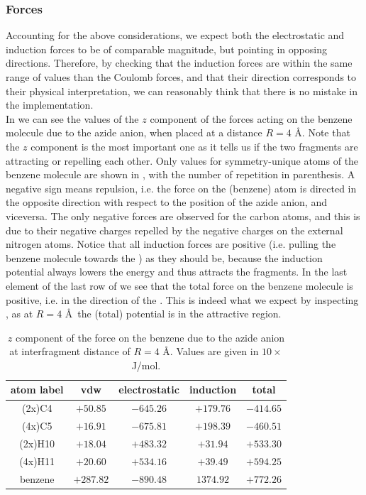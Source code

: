 \documentclass[utf8]{article}
\begin{document}
\subsubsection{Forces}
Accounting for the above considerations, we expect both the electrostatic and induction forces
to be of comparable magnitude, but pointing in opposing directions.
Therefore, by checking that the induction forces are within the same range of values than
the Coulomb forces, and that their direction corresponds to their physical interpretation,
we can reasonably think that there is no mistake in the implementation.\\
In  we can see the values of the $z$ component of the forces acting
on the benzene molecule due to the azide anion, when placed at a distance $R=4$ \AA.
Note that the $z$ component is the most important one as it tells us if the two fragments
are attracting or repelling each other.
Only values for symmetry-unique atoms of the benzene molecule are shown in
, with the number of repetition in parenthesis.
A negative sign means repulsion, i.e. the force on the (benzene) atom is directed in the
opposite direction with respect to the position of the azide anion, and viceversa.
The only negative forces are observed for the carbon atoms, and this is due to their negative
charges repelled by the negative charges on the external nitrogen atoms.
Notice that all induction forces are positive (i.e. pulling the benzene molecule towards
the \ntm) as they should be, because the induction potential always lowers the energy and
thus attracts the fragments.
In the last element of the last row of  we see that
the total force on the benzene molecule is positive, i.e. in the direction of the \ntm.
This is indeed what we expect by inspecting , as at $R=4$ \AA\ the
(total) potential is in the attractive region.\\
%
\begin{table}
    \captionsetup{width=\textwidth}
    \centering
    \caption{$z$ component of the force on the benzene due to the azide anion
    at interfragment distance of $R=4$ \AA. Values are given in $10\times$J/mol.}
    \begin{tabular}{ccccc}
    \toprule
    atom label  & vdw     & electrostatic & induction & total \\
    \midrule
    (2x)C4    & $+50.85$  & $-645.26$     & $+179.76$ & $-414.65$ \\
    (4x)C5    & $+16.91$  & $-675.81$     & $+198.39$ & $-460.51$ \\
    (2x)H10   & $+18.04$  & $+483.32$     & $+31.94$  & $+533.30$ \\
    (4x)H11   & $+20.60$  & $+534.16$     & $+39.49$  & $+594.25$ \\
    \midrule
    benzene   & $+287.82$ & $-890.48$     & $1374.92$ & $+772.26$ \\
    \bottomrule
    \end{tabular}
    \label{tab:forces_benzene_att}
\end{table}
\end{document}
